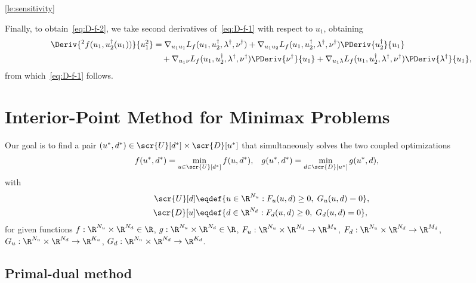 \documentclass[11pt]{article}
\begin{document}
\begin{proof-lemma}{\ref{le:sensitivity}}
  \medskip

  Finally, to obtain~\eqref{eq:D-f-2}, we take second derivatives
  of~\eqref{eq:D-f-1} with respect to $u_1$, obtaining
  \begin{align*}
    \Deriv{^2f(u_1,u_2^\dagger(u_1))}{u_1^2}
    &=
    \nabla_{u_1u_1}L_f(u_1,u_2^\dagger,\lambda^\dagger,\nu^\dagger)
    +\nabla_{u_1u_2}L_f(u_1,u_2^\dagger,\lambda^\dagger,\nu^\dagger)\PDeriv{u_2^\dagger}{u_1}\\&\quad
    +\nabla_{u_1\nu}L_f(u_1,u_2^\dagger,\lambda^\dagger,\nu^\dagger)\PDeriv{\nu^\dagger}{u_1}
    +\nabla_{u_1\lambda}L_f(u_1,u_2^\dagger,\lambda^\dagger,\nu^\dagger)\PDeriv{\lambda^\dagger}{u_1},
  \end{align*}
  from which~\eqref{eq:D-f-1} follows.\frQED
\end{proof-lemma}

\section{Interior-Point Method for Minimax Problems}
\label{sec:ipm}

Our goal is to find a pair
$(u^*,d^*)\in\scr{U}[d^*]\times\scr{D}[u^*]$ that simultaneously
solves the two coupled optimizations
\begin{align}\label{eq:equilibria}
  f(u^*,d^*)&=\min_{u\in\scr{U}[d^*]} f(u,d^*), &
  g(u^*,d^*)&=\min_{d\in\scr{D}[u^*]} g(u^*,d),
\end{align}
with
\begin{align*}
    \scr{U}[d]&\eqdef\{u\in\R^{N_u}: F_u(u,d)\ge 0,\; G_u(u,d)=0\}, \\
    \scr{D}[u]&\eqdef\{d\in\R^{N_d}: F_d(u,d)\ge 0,\; G_d(u,d)=0\},
\end{align*}
for given functions $f:\R^{N_u}\times\R^{N_d}\in\R$, $g:\R^{N_u}\times\R^{N_d}\in\R$,
$F_u:\R^{N_u}\times\R^{N_d}\to\R^{M_u}$, $F_d:\R^{N_u}\times\R^{N_d}\to\R^{M_d}$,
$G_u:\R^{N_u}\times\R^{N_d}\to\R^{K_u}$, $G_d:\R^{N_u}\times\R^{N_d}\to\R^{K_d}$.


\subsection{Primal-dual method}
\end{document}
